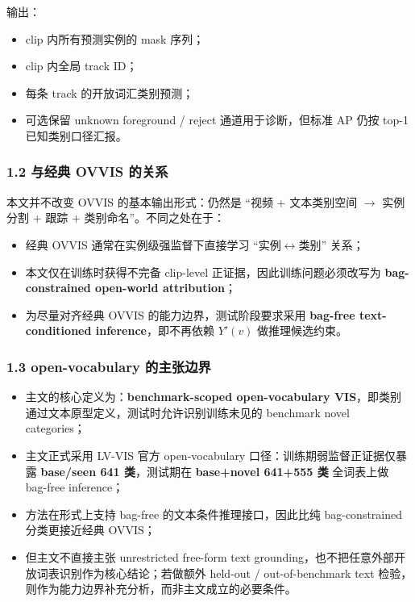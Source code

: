 \documentclass[UTF8]{ctexart}
\begin{document}
输出：
\begin{itemize}
\item clip 内所有预测实例的 mask 序列；
\item clip 内全局 track ID；
\item 每条 track 的开放词汇类别预测；
\item 可选保留 unknown foreground / reject 通道用于诊断，但标准 AP 仍按 top-1 已知类别口径汇报。
\end{itemize}

\subsubsection*{1.2 与经典 OVVIS 的关系}
本文并不改变 OVVIS 的基本输出形式：仍然是 ``视频 + 文本类别空间 $\rightarrow$ 实例分割 + 跟踪 + 类别命名''。不同之处在于：
\begin{itemize}
\item 经典 OVVIS 通常在实例级强监督下直接学习 ``实例$\leftrightarrow$类别'' 关系；
\item 本文仅在训练时获得不完备 clip-level 正证据，因此训练问题必须改写为 \textbf{bag-constrained open-world attribution}；
\item 为尽量对齐经典 OVVIS 的能力边界，测试阶段要求采用 \textbf{bag-free text-conditioned inference}，即不再依赖 $Y'(v)$ 做推理候选约束。
\end{itemize}

\subsubsection*{1.3 open-vocabulary 的主张边界}
\begin{itemize}
\item 主文的核心定义为：\textbf{benchmark-scoped open-vocabulary VIS}，即类别通过文本原型定义，测试时允许识别训练未见的 benchmark novel categories；
\item 主文正式采用 LV-VIS 官方 open-vocabulary 口径：训练期弱监督正证据仅暴露 \textbf{base/seen 641 类}，测试期在 \textbf{base+novel 641+555 类} 全词表上做 bag-free inference；
\item 方法在形式上支持 bag-free 的文本条件推理接口，因此比纯 bag-constrained 分类更接近经典 OVVIS；
\item 但主文不直接主张 unrestricted free-form text grounding，也不把任意外部开放词表识别作为核心结论；若做额外 held-out / out-of-benchmark text 检验，则作为能力边界补充分析，而非主文成立的必要条件。
\end{itemize}
\end{document}
